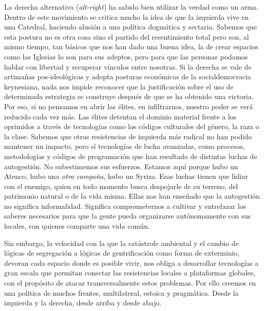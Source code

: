 La derecha alternativa (\emph{alt-right}) ha sabido bien utilizar la verdad como un arma. Dentro de este movimiento se critica mucho la idea de que la izquierda vive en una Catedral, haciendo alusión a una política dogmática y sectaria. Sabemos que esta postura no es otra cosa sino el partido del resentimiento total pero son, al mismo tiempo, tan básicos que nos han dado una buena idea, la de crear espacios como las Iglesias lo son para sus adeptos, pero para que las personas podamos hablar con libertad y recuperar vínculos entre nosotras. Si la derecha se vale de artimañas pos-ideológicas y adopta posturas económicas de la socialdemocracia keynesiana, nada nos impide reconocer que la justificación sobre el uso de determinada estrategia se construye después de que se ha obtenido una victoria. Por eso, si no pensamos en abrir las élites, en infiltrarnos, nuestro poder se verá reducido cada vez más. Las élites detentan el dominio material frente a los oprimidos a través de tecnologías como los códigos culturales del género, la raza o la clase. Sabemos que otras resistencias de izquierda más radical no han podido mantener un impacto, pero sí tecnologías de lucha avanzadas, como procesos, metodologías y códigos de programación que han resultado de distintas luchas de autogestión. No subestimemos sus esfuerzos. Estamos aquí porque hubo un Atenco, hubo una \emph{otra campaña}, hubo un Syriza. Esas luchas tienen que lidiar con el enemigo, quien en todo momento busca despojarle de su terreno, del patrimonio natural o de la vida misma. Ellas nos han enseñado que la autogestión no significa informalidad. Significa comprometernos a cultivar y entrelazar los saberes necesarios para que la gente pueda organizarse autónomamente con sus locales, con quienes comparte una vida común.

Sin embargo, la velocidad con la que la catástrofe ambiental y el cambio de lógicas de segregación a lógicas de gentrificación como forma de exterminio, devoran cada espacio donde es posible vivir, nos obliga a desarrollar tecnologías a gran escala que permitan conectar las resistencias locales a plataformas globales, con el propósito de atacar transversalmente estos problemas. Por ello creemos en una política de muchos frentes, multilateral, estoica y pragmática. Desde la izquierda y la derecha, desde arriba y desde abajo.

